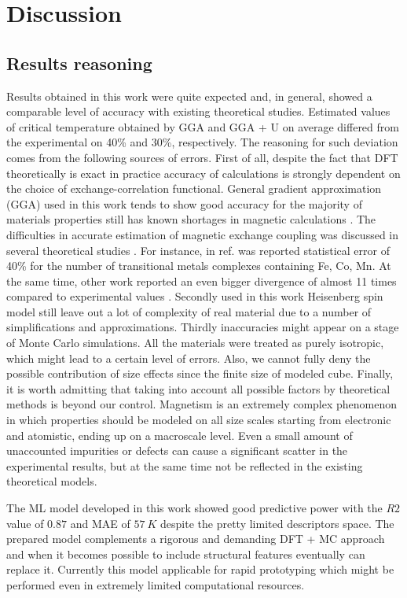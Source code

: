 \chapter{Discussion}
\section{Results reasoning}
Results obtained in this work were quite expected and, in general, showed a comparable level of accuracy with existing theoretical studies.   Estimated values of critical temperature obtained by GGA and GGA + U on average differed from the experimental on 40\% and 30\%, respectively. The reasoning for such deviation comes from the following sources of errors. First of all, despite the fact that DFT theoretically is exact in practice accuracy of calculations is strongly dependent on the choice of exchange-correlation functional. General gradient approximation (GGA) used in this work tends to show good accuracy for the majority of materials properties still has known shortages in magnetic calculations \cite{Becke_1988}.  The difficulties in accurate estimation of magnetic exchange coupling was discussed in several theoretical studies \cite{Ruiz_2005, Ruiz_2011, Joshi_2020}.  For instance, in ref.  \cite{Phillips_2012} was reported statistical error of 40\% for the number of transitional metals complexes containing Fe, Co, Mn.  At the same time, other work reported an even bigger divergence of almost 11 times compared to experimental values \cite{Joshi_2020}. Secondly used in this work Heisenberg spin model still leave out a lot of complexity of real material due to a number of simplifications and approximations. Thirdly inaccuracies might appear on a stage of Monte Carlo simulations. All the materials were treated as purely isotropic, which might lead to a certain level of errors. Also, we cannot fully deny the possible contribution of size effects since the finite size of modeled cube. Finally, it is worth admitting that taking into account all possible factors by theoretical methods is beyond our control. Magnetism is an extremely complex phenomenon in which properties should be modeled on all size scales starting from electronic and atomistic, ending up on a macroscale level.  Even a small amount of unaccounted impurities or defects can cause a significant scatter in the experimental results, but at the same time not be reflected in the existing theoretical models.

The ML model developed in this work showed good predictive power with the $R2$ value of $0.87$ and MAE of $57\ K$ despite the pretty limited descriptors space. The prepared model complements a rigorous and demanding DFT + MC approach and when it becomes possible to include structural features eventually can replace it.  Currently this model applicable for rapid prototyping which might be performed even in extremely limited computational resources.




